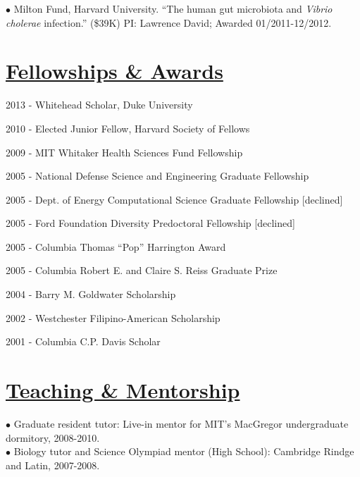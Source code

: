\documentclass[overlapped,line,11pt]{res}
\newenvironment{list1}{
  \begin{list}{\ding{113}}{%
      \setlength{\itemsep}{0in}
      \setlength{\parsep}{0in} \setlength{\parskip}{0in}
      \setlength{\topsep}{0in} \setlength{\partopsep}{0in} 
      \setlength{\leftmargin}{0.17in}}}{\end{list}}
\begin{document}
\begin{resume}
\vspace{-10mm}
\hangindent=0.5in $\bullet$\hspace{.1in} Milton Fund, Harvard
University. ``The human gut microbiota and \emph{Vibrio cholerae}
infection.'' (\$39K) PI: Lawrence David; Awarded 01/2011-12/2012. 

\section{\underline{\sc Fellowships \& Awards}} 
\vspace{.25in}
\begin{list1}
\item[] 2013 - Whitehead Scholar, Duke University%
\item[] 2010 - Elected Junior Fellow, Harvard Society of Fellows%
\item[] 2009 - MIT Whitaker Health Sciences Fund Fellowship %
\item[] 2005 - National Defense Science and Engineering Graduate
  Fellowship %
\item[] 2005 - Dept. of Energy Computational Science Graduate Fellowship
  [declined] %
\item[] 2005 - Ford Foundation Diversity Predoctoral Fellowship
  [declined] %
\item[] 2005 - Columbia Thomas ``Pop'' Harrington Award
\item[] 2005 - Columbia Robert E. and Claire S. Reiss Graduate Prize
\item[] 2004 - Barry M. Goldwater Scholarship
\item[] 2002 - Westchester Filipino-American Scholarship
\item[] 2001 - Columbia C.P. Davis Scholar
\end{list1}

\section{\underline{\sc Teaching \& Mentorship}}
\vspace{.05in}

\hangindent=0.5in $\bullet$\hspace{.1in} Graduate resident tutor:
Live-in mentor for MIT's MacGregor undergraduate dormitory, 2008-2010.  \\

\vspace{-10mm}
\hangindent=0.5in $\bullet$\hspace{.1in} Biology tutor and Science
Olympiad mentor (High School): Cambridge Rindge and Latin,
2007-2008. \\


\end{resume}
\end{document}
